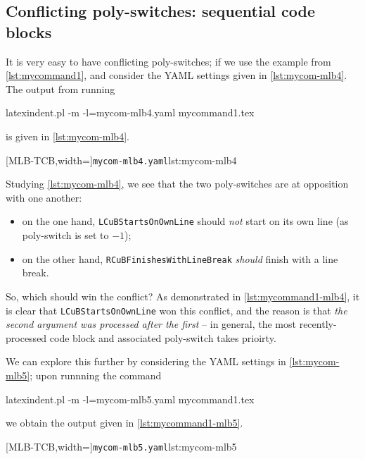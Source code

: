 \subsection{Conflicting poly-switches: sequential code blocks}
	It is very easy to have conflicting poly-switches; if we use the example from \vref{lst:mycommand1},
	and consider the YAML settings given in \cref{lst:mycom-mlb4}. The output from running
	\begin{commandshell}
latexindent.pl -m -l=mycom-mlb4.yaml mycommand1.tex
\end{commandshell}
	is given in \cref{lst:mycom-mlb4}.

	\begin{minipage}{.4\linewidth}
	\end{minipage}
	\hfill
	\begin{minipage}{.55\linewidth}
		[MLB-TCB,width=\linewidth]{\texttt{mycom-mlb4.yaml}}{lst:mycom-mlb4}
	\end{minipage}

	Studying \cref{lst:mycom-mlb4}, we see that the two poly-switches are at opposition with one another:
	\begin{itemize}
		\item on the one hand, \texttt{LCuBStartsOnOwnLine} should \emph{not} start on its own line (as poly-switch is set to $-1$);
		\item on the other hand, \texttt{RCuBFinishesWithLineBreak} \emph{should} finish with a line break.
	\end{itemize}
	So, which should win the conflict? As demonstrated in \cref{lst:mycommand1-mlb4}, it is clear that \texttt{LCuBStartsOnOwnLine} won
	this conflict, and the reason is that \emph{the second argument was processed after the first} -- in general, the most recently-processed
	code block and associated poly-switch takes prioirty.

	We can explore this further by considering the YAML settings in \cref{lst:mycom-mlb5}; upon runnning the command
	\begin{commandshell}
latexindent.pl -m -l=mycom-mlb5.yaml mycommand1.tex
\end{commandshell}
	we obtain the output given in \cref{lst:mycommand1-mlb5}.

	\begin{minipage}{.4\linewidth}
	\end{minipage}
	\hfill
	\begin{minipage}{.55\linewidth}
		[MLB-TCB,width=\linewidth]{\texttt{mycom-mlb5.yaml}}{lst:mycom-mlb5}
	\end{minipage}

